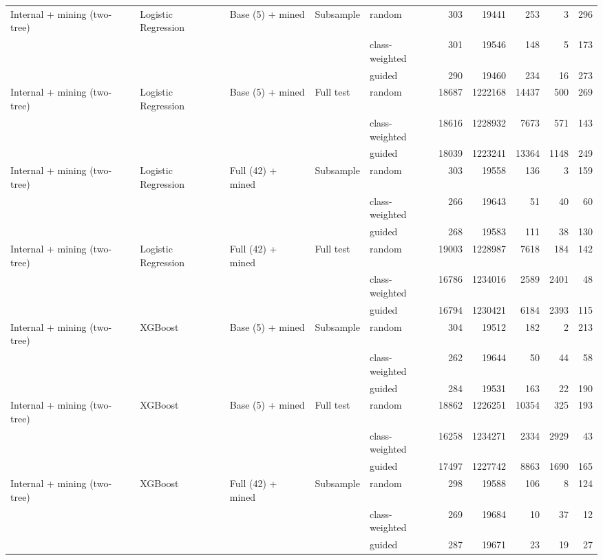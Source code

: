 \begin{longtable}{lllllrrrrr}
\addlinespace
Internal + mining (two-tree) & Logistic Regression & Base (5) + mined & Subsample & random & 303 & 19441 & 253 & 3 & 296 \\
 &  &  &  & class-weighted & 301 & 19546 & 148 & 5 & 173 \\
 &  &  &  & guided & 290 & 19460 & 234 & 16 & 273 \\
\addlinespace
Internal + mining (two-tree) & Logistic Regression & Base (5) + mined & Full test & random & 18687 & 1222168 & 14437 & 500 & 269 \\
 &  &  &  & class-weighted & 18616 & 1228932 & 7673 & 571 & 143 \\
 &  &  &  & guided & 18039 & 1223241 & 13364 & 1148 & 249 \\
\addlinespace
Internal + mining (two-tree) & Logistic Regression & Full (42) + mined & Subsample & random & 303 & 19558 & 136 & 3 & 159 \\
 &  &  &  & class-weighted & 266 & 19643 & 51 & 40 & 60 \\
 &  &  &  & guided & 268 & 19583 & 111 & 38 & 130 \\
\addlinespace
Internal + mining (two-tree) & Logistic Regression & Full (42) + mined & Full test & random & 19003 & 1228987 & 7618 & 184 & 142 \\
 &  &  &  & class-weighted & 16786 & 1234016 & 2589 & 2401 & 48 \\
 &  &  &  & guided & 16794 & 1230421 & 6184 & 2393 & 115 \\
\addlinespace
Internal + mining (two-tree) & XGBoost & Base (5) + mined & Subsample & random & 304 & 19512 & 182 & 2 & 213 \\
 &  &  &  & class-weighted & 262 & 19644 & 50 & 44 & 58 \\
 &  &  &  & guided & 284 & 19531 & 163 & 22 & 190 \\
\addlinespace
Internal + mining (two-tree) & XGBoost & Base (5) + mined & Full test & random & 18862 & 1226251 & 10354 & 325 & 193 \\
 &  &  &  & class-weighted & 16258 & 1234271 & 2334 & 2929 & 43 \\
 &  &  &  & guided & 17497 & 1227742 & 8863 & 1690 & 165 \\
\addlinespace
Internal + mining (two-tree) & XGBoost & Full (42) + mined & Subsample & random & 298 & 19588 & 106 & 8 & 124 \\
 &  &  &  & class-weighted & 269 & 19684 & 10 & 37 & 12 \\
 &  &  &  & guided & 287 & 19671 & 23 & 19 & 27 \\

\end{longtable}
